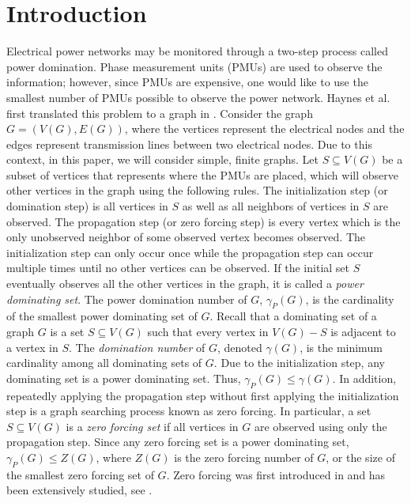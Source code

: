 \documentclass[11pt]{article}
\begin{document}
\section{Introduction} \label{sec:intro}
Electrical power networks may be monitored through a  two-step process called power domination. Phase measurement units (PMUs) are used to observe the information; however, since PMUs are expensive, one would like to use the smallest number of PMUs possible to observe the power network. Haynes et al. first translated this problem to a graph in \cite{electricgrids}. Consider the graph $G = (V(G), E(G))$, where the vertices represent the electrical nodes and the edges represent transmission lines between two electrical nodes. Due to this context, in this paper, we will consider simple, finite graphs. Let $S \subseteq V(G)$ be a subset of vertices that represents where the PMUs are placed, which will observe other vertices in the graph using the following rules. The initialization step (or domination step) is all vertices in $S$ as well as all neighbors of vertices in $S$ are observed. The propagation step (or zero forcing step) is every  vertex which is the only unobserved neighbor of some observed vertex becomes observed. The initialization step can only occur once while the propagation step can occur multiple times until no other vertices can be observed. If the initial set $S$ eventually observes all the other vertices in the graph, it is called a {\it power dominating set}. The power domination number of $G$, $\gamma_P(G)$, is the cardinality of the smallest power dominating set of $G$. Recall that a dominating set of a graph $G$ is a set $S \subseteq V(G)$ such that every vertex in $V(G) - S$ is adjacent to a vertex in $S$. The \emph{domination number} of $G$, denoted $\gamma(G)$, is the minimum cardinality among all dominating sets of $G$. Due to the initialization step, any dominating set is a power dominating set. Thus, $\gamma_P(G) \leq \gamma(G)$. In addition, repeatedly applying the propagation step without first applying the initialization step is a graph searching process known as zero forcing. In particular, a set $S \subseteq V(G)$ is a {\it zero forcing set} if all vertices in $G$ are observed using only the propagation step. Since any zero forcing set is a power dominating set, $\gamma_P(G) \leq Z(G)$, where $Z(G)$ is the zero forcing number of $G$, or the size of the smallest zero forcing set of $G$. Zero forcing was first introduced in \cite{AIM} and has been extensively studied, see \cite{ARSS-2020,BBFHHSDH-2010,BBFHHSDH-2013,KBDF,DH-2020,GR-2018}. 
\end{document}
